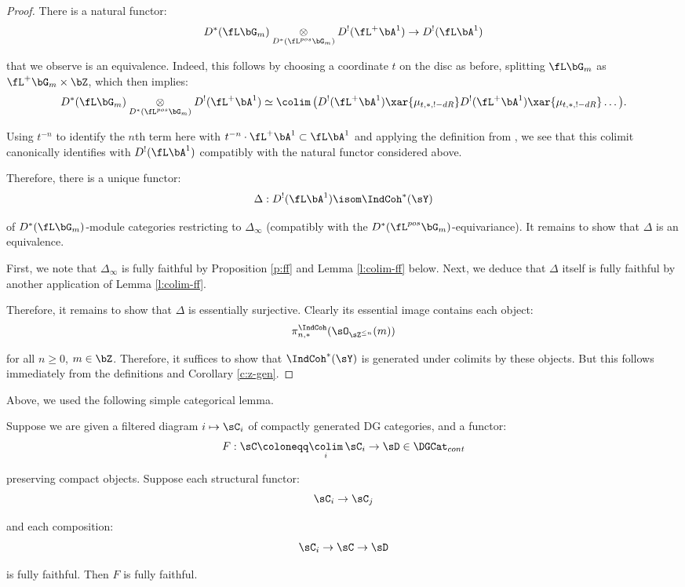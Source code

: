 \begin{proof}

There is a natural functor:
%
\[
D^*(\fL\bG_m) \underset{D^*(\fL^{pos}\bG_m)}{\otimes} D^!(\fL^+\bA^1) \to
D^!(\fL\bA^1)
\]

 that we observe is an equivalence. Indeed, this follows
by choosing a coordinate $t$ on the disc as before, splitting
$\fL\bG_m$ as $\fL^+\bG_m \times \bZ$, which then implies:
%
\[
D^*(\fL\bG_m) \underset{D^*(\fL^{pos}\bG_m)}{\otimes} D^!(\fL^+\bA^1) \simeq
\colim \, \big(D^!(\fL^+\bA^1) \xar{\mu_{t,*,!-dR}} D^!(\fL^+\bA^1)
\xar{\mu_{t,*,!-dR}} \ldots \big).
\]

 Using $t^{-n}$ to identify the $n$th term here with
$t^{-n} \cdot \fL^+ \bA^1 \subset \fL \bA^1$ and applying the
definition from \cite{dmod}, we see that this
colimit canonically identifies with $D^!(\fL\bA^1)$ compatibly with the
natural functor considered above.

Therefore, there is a unique functor:
%
\[
\Delta:D^!(\fL\bA^1) \isom  \IndCoh^*(\sY)
\]

 of $D^*(\fL\bG_m)$-module categories restricting to
$\Delta_{\infty}$ (compatibly with the $D^*(\fL^{pos}\bG_m)$-equivariance).
It remains to show that $\Delta$ is an equivalence.

First, we note that $\Delta_{\infty}$ is fully faithful by
Proposition \ref{p:ff} and Lemma \ref{l:colim-ff} below. Next,
we deduce that $\Delta$ itself is fully faithful by another
application of Lemma \ref{l:colim-ff}.

Therefore, it remains to show that $\Delta$ is essentially surjective.
Clearly its essential image contains each object:
%
\[
\pi_{n,*}^{\IndCoh}(\sO_{\sZ^{\leq n}}(m))
\]

 for all $n \geq 0$, $m \in \bZ$. Therefore, it suffices
to show that $\IndCoh^*(\sY)$ is generated under colimits by these objects.
But this follows immediately from the definitions and Corollary \ref{c:z-gen}.

\end{proof}

Above, we used the following simple categorical lemma.

\begin{lem}
\notready\label{l:colim-ff}

Suppose we are given a filtered diagram $i \mapsto \sC_i$ of compactly
generated DG categories, and a functor:
%
\[
F:\sC \coloneqq \underset{i}{\colim} \, \sC_i \to \sD \in \DGCat_{cont}
\]

 preserving compact objects. Suppose each structural functor:
%
\[
\sC_i \to \sC_j
\]

 and each composition:
%
\[
\sC_i \to \sC \to \sD
\]

 is fully faithful. Then $F$ is fully faithful.

\end{lem}

